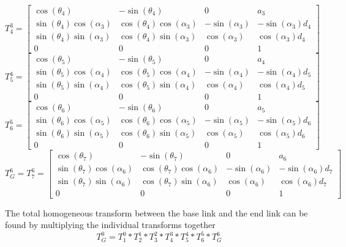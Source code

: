 \documentclass{article}
\begin{document}
\[T_{4}^3 =
\begin{bmatrix}
    \cos(\theta _4) & -\sin(\theta _4) & 0 & a_{3} \\
    \sin(\theta _4)\cos(\alpha _{3}) & \cos(\theta _4)\cos(\alpha _{3}) & -\sin(\alpha _{3}) & -\sin(\alpha _{3})d_4 \\
    \sin(\theta _4)\sin(\alpha _{3}) & \cos(\theta _4)\sin(\alpha _{3}) & \cos(\alpha _{3}) & \cos(\alpha _{3})d_4 \\
    0 & 0 & 0 & 1

\end{bmatrix}
\]
\[T_{5}^4 =
\begin{bmatrix}
    \cos(\theta _5) & -\sin(\theta _5) & 0 & a_{4} \\
    \sin(\theta _5)\cos(\alpha _{4}) & \cos(\theta _5)\cos(\alpha _{4}) & -\sin(\alpha _{4}) & -\sin(\alpha _{4})d_5 \\
    \sin(\theta _5)\sin(\alpha _{4}) & \cos(\theta _5)\sin(\alpha _{4}) & \cos(\alpha _{4}) & \cos(\alpha _{4})d_5 \\
    0 & 0 & 0 & 1

\end{bmatrix}
\]
\[T_{6}^5 =
\begin{bmatrix}
    \cos(\theta _6) & -\sin(\theta _6) & 0 & a_{5} \\
    \sin(\theta _6)\cos(\alpha _{5}) & \cos(\theta _6)\cos(\alpha _{5}) & -\sin(\alpha _{5}) & -\sin(\alpha _{5})d_6 \\
    \sin(\theta _6)\sin(\alpha _{5}) & \cos(\theta _6)\sin(\alpha _{5}) & \cos(\alpha _{5}) & \cos(\alpha _{5})d_6 \\
    0 & 0 & 0 & 1

\end{bmatrix}
\]
\[T_{G}^6 = T_7^6 =
\begin{bmatrix}
    \cos(\theta _7) & -\sin(\theta _7) & 0 & a_{6} \\
    \sin(\theta _7)\cos(\alpha _{6}) & \cos(\theta _7)\cos(\alpha _{6}) & -\sin(\alpha _{6}) & -\sin(\alpha _{6})d_7 \\
    \sin(\theta _7)\sin(\alpha _{6}) & \cos(\theta _7)\sin(\alpha _{6}) & \cos(\alpha _{6}) & \cos(\alpha _{6})d_7 \\
    0 & 0 & 0 & 1

\end{bmatrix}
\]

The total homogeneous transform between the base link and the end link can be found by multiplying the individual transforms together
\[T_G^0 = T_1^0 * T_2^1 * T_3^2 * T_4^3 * T_5^4 * T_6^5 * T_G^6 \]
\end{document}
